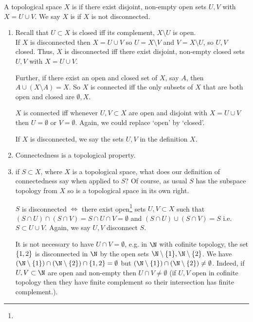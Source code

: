 \begin{definition}[Connectedness]
A topological space $X$ is  if there exist disjoint, non-empty open sets $U,V$ with $X = U\cup V$.
We say $X$ is  if $X$ is not disconnected.
\end{definition}

\begin{remark}
    \begin{enumerate}
        \item Recall that $U\subset X$ is closed iff its complement, $X \setminus U$ is open. \\
        If $X$ is disconnected then $X = U \cup V$ so $U = X \setminus V$ and $V = X \setminus U$, so $U, V$ closed.
        Thus, $X$ is disconnected iff there exist disjoint, non-empty closed sets $U,V$ with $X = U\cup V$.
        
        Further, if there exist an open and closed set of $X$, say $A$, then $A \cup (X \setminus A) = X$.
        So $X$ is connected iff the only subsets of $X$ that are both open and closed are $\emptyset, X$.
        
        $X$ is connected iff whenever $U,V\subset X$ are open and disjoint with $X=U\cup V$ then $U=\emptyset$ or $V=\emptyset$. Again, we could replace `open' by `closed'.

        If $X$ is disconnected, we say the sets $U,V$ in the definition  $X$.

        \item Connectedness is a topological property.
        \item if $S\subset X$, where $X$ is a topological space, what does our definition of connectedness say when applied to $S$? Of course, as usual $S$ has the subspace topology from $X$ so is a topological space in its own right. 

        $S$ is disconnected $\iff$ there exist open\footnote{} sets $U,V\subset X$ such that $(S \cap U) \cap (S \cap V) = S\cap U\cap V = \emptyset$ and $(S \cap U) \cup (S \cap V) = S$ i.e. $S\subset U\cup V$. Again, we say $U,V$ disconnect $S$.
        
        \begin{warning}
            It is not necessary to have $U\cap V =\emptyset$, e.g. in $\N$ with cofinite topology, the set $\{1,2\}$ is disconnected in $\N$ by the open sets $\N\setminus \set{1}, \N\setminus \set{2}$. We have $(\N\setminus \set{1}) \cap (\N\setminus \set{2})\cap \set{1,2} = \emptyset$ but $(\N\setminus \set{1})\cap (\N\setminus \set{2}) \neq \emptyset$. Indeed, if $U,V\subset \N$ are open and non-empty then $U\cap V\neq\emptyset$ (if $U, V$ open in cofinite topology then they have finite complement so their intersection has finite complement.).
        \end{warning} 
        

\end{enumerate}
\end{remark}
